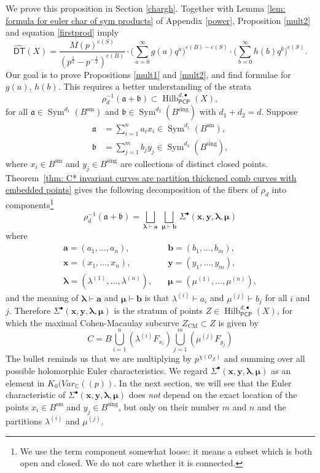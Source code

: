 \documentclass{amsart}
\theoremstyle{definition}
\newcommand{\CC} {\mathbb{C}}          %
\renewcommand{\O}{\mathcal{O}}
\newcommand{\Sym}{\operatorname{Sym}}
\newcommand{\Hilb}{\operatorname{Hilb}}
\newcommand{\DT}{\mathsf{DT}}
\newcommand{\CM}{\operatorname{CM}}
\newcommand{\sm}{\operatorname{sm}}
\newcommand{\sing}{\operatorname{sing}}
\newcommand{\boldx}{\boldsymbol{x}}
\newcommand{\boldy}{\boldsymbol{y}}
\newcommand{\bolda}{\boldsymbol{a}}
\newcommand{\boldb}{\boldsymbol{b}}
\newcommand{\boldlambda}{\boldsymbol{\lambda }}
\newcommand{\boldmu}{\boldsymbol{\mu }}
\newcommand{\Sigmaxylambdamu}{\Sigma^{\bullet }(\boldx ,\boldy ,\boldlambda ,\boldmu )}
\newcommand{\DThat}{\widehat{\DT}}
\newcommand{\PCP}{\mathsf{PCP}}
\begin{document}
We prove this proposition in Section \ref{chargh}. Together with Lemma \ref{lem: formula for euler char of sym products} of Appendix \ref{power}, Proposition \ref{mult2} and equation \eqref{firstprod} imply
\begin{equation} \label{initialprod}
\DThat (X) = \frac{M(p)^{e(S)}}{(p^{\frac{1}{2}} -
p^{-\frac{1}{2}})^{e(B)}} \cdot \Bigg( \sum_{a=0}^{\infty} g(a) q^a
\Bigg)^{e(B) - e(S)} \cdot \Bigg( \sum_{b=0}^{\infty} h(b) q^b \Bigg)^{e(S)}.
\end{equation}
Our goal is to prove Propositions \ref{mult1} and \ref{mult2}, and
find formulae for $g(a)$, $h(b)$. This requires a better understanding
of the strata
$$
\rho_{d}^{-1} (\mathfrak{a} + \mathfrak{b}) \subset \Hilb^{d, \bullet}_{\PCP }(X),
$$
for all $\mathfrak{a} \in \Sym^{d_1}(B^{\sm})$ and $\mathfrak{b} \in \Sym^{d_2}(B^{\sing})$ with $d_1+d_2=d$. Suppose 
\begin{align*}
\mathfrak{a} &= \sum_{i=1}^{n} a_i x_i \in \Sym^{d_1}(B^{\sm}), \\
\mathfrak{b} &= \sum_{j=1}^{m} b_j y_j \in \Sym^{d_2}(B^{\sing}),
\end{align*}
where $x_i \in B^{\sm}$ and $y_j \in B^{\sing}$ are collections of
distinct closed points. Theorem~\ref{thm: C* invariant curves are
partition thickened comb curves with embedded points} gives the
following decomposition of the fibers of $\rho_{d}$ into
components\footnote{We use the term component somewhat loose: it means
a subset which is both open and closed. We do not care whether it is
connected.}
\begin{equation} \label{eqn: components of fibers of rho}
\rho_{d}^{-1}(\mathfrak{a}+ \mathfrak{b}) = \bigsqcup_{\boldlambda
\vdash \bolda}\, \bigsqcup_{\boldmu \vdash \boldb}\,  \Sigmaxylambdamu
\end{equation}
where 
\begin{align*}
\bolda =(a_{1},\dotsc ,a_{n}),&\quad \boldb =(b_{1},\dotsc
,b_{m}),\\
\boldx =(x_{1},\dotsc ,x_{n}),&\quad \boldy =(y_{1},\dotsc
,y_{m}),\\
\boldlambda =(\lambda^{(1)},\dotsc ,\lambda^{(n)}),&\quad \boldmu =(\mu^{(1)},\dotsc ,\mu^{(n)}),
\end{align*}
and the meaning of $\boldlambda \vdash \bolda$ and $\boldmu \vdash
\boldb$ is that $\lambda^{(i)}\vdash a_{i}$ and $\mu^{(j)}\vdash
b_{j}$ for all $i$ and $j$.  Therefore $\Sigmaxylambdamu $ is the
stratum of points $Z \in \Hilb^{d,\bullet}_{\PCP }(X)$, for which the
maximal Cohen-Macaulay subcurve $Z_{\CM} \subset Z$ is given by
\[
C = B \bigcup_{i=1}^{n}\left(\lambda^{(i)}F_{x_{i}} \right)
\bigcup_{j=1}^{m}\left(\mu^{(j)}F_{y_{j}} \right)
\]
The bullet reminds us that we are multiplying by $p^{\chi (\O_{Z})}$
and summing over all possible holomorphic Euler characteristics. We
regard $\Sigmaxylambdamu$ as an element in $ K_{0}(Var_{\CC}((p))$. In
the next section, we will see that the Euler characteristic of
$\Sigmaxylambdamu $ does \emph{not} depend on the exact location of
the points $x_i \in B^{\sm}$ and $y_j \in B^{\sing}$, but only on
their number $m$ and $n$ and the partitions $\lambda^{(i)}$ and
$\mu^{(j)}$.
\end{document}
